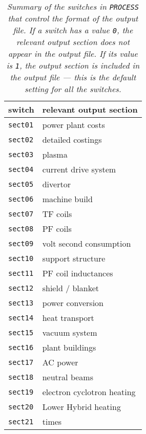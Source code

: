 \documentclass[11pt,a4paper]{report}
\newcommand{\process}{\mbox{\texttt{PROCESS}}}
\begin{document}
\begin{table}[tbph]
\begin{center}

\begin{tabular}{||l|l||} \hline
switch      & relevant output section    \\ \hline
\texttt{sect01} & power plant costs          \\
\texttt{sect02} & detailed costings          \\
\texttt{sect03} & plasma                     \\
\texttt{sect04} & current drive system       \\
\texttt{sect05} & divertor                   \\
\texttt{sect06} & machine build              \\
\texttt{sect07} & TF coils                   \\
\texttt{sect08} & PF coils                   \\
\texttt{sect09} & volt second consumption    \\
\texttt{sect10} & support structure          \\
\texttt{sect11} & PF coil inductances        \\
\texttt{sect12} & shield / blanket           \\
\texttt{sect13} & power conversion           \\
\texttt{sect14} & heat transport             \\
\texttt{sect15} & vacuum system              \\
\texttt{sect16} & plant buildings            \\
\texttt{sect17} & AC power                   \\
\texttt{sect18} & neutral beams              \\
\texttt{sect19} & electron cyclotron heating \\
\texttt{sect20} & Lower Hybrid heating       \\ 
\texttt{sect21} & times                      \\ \hline
\end{tabular}
\end{center}
\caption[List of switches controlling the output to file]
{\label{tab:osections}
  \textit{Summary of the switches in \process\/ that control the format of the output
    file. If a switch has a value \texttt{0}, the relevant output section
    does not appear in the output file. If its value is \texttt{1}, the
    output section is included in the output file --- this is the default
    setting for all the switches.}
}
\end{table}
\end{document}
